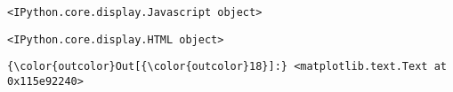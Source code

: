 \documentclass[11pt]{article}
\begin{document}
    
    \begin{verbatim}
<IPython.core.display.Javascript object>
    \end{verbatim}

    
    
    \begin{verbatim}
<IPython.core.display.HTML object>
    \end{verbatim}

    
\begin{Verbatim}[commandchars=\\\{\}]
{\color{outcolor}Out[{\color{outcolor}18}]:} <matplotlib.text.Text at 0x115e92240>
\end{Verbatim}
            

    
    
    
    
\end{document}
